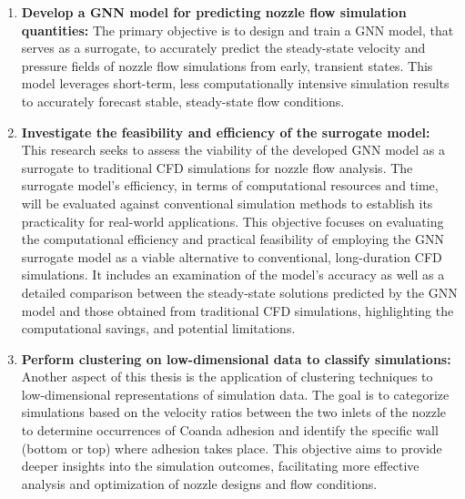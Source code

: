 \begin{enumerate}
\item \textbf{Develop a GNN model for predicting nozzle flow simulation quantities:} 
The primary objective is to design and train a GNN model, that serves as a surrogate, to accurately predict the steady-state velocity and pressure fields of nozzle flow simulations from early, transient states. This model leverages short-term, less computationally intensive simulation results to accurately forecast stable, steady-state flow conditions.
\item \textbf{Investigate the feasibility and efficiency of the surrogate model:} This research seeks to assess the viability of the developed GNN model as a surrogate to traditional CFD simulations for nozzle flow analysis. The surrogate model's efficiency, in terms of computational resources and time, will be evaluated against conventional simulation methods to establish its practicality for real-world applications.
This objective focuses on evaluating the computational efficiency and practical feasibility of employing the GNN surrogate model as a viable alternative to conventional, long-duration CFD simulations. It includes an examination of the model's accuracy as well as a detailed comparison between the steady-state solutions predicted by the GNN model and those obtained from traditional CFD simulations, highlighting the computational savings, and potential limitations.
\item \textbf{Perform clustering on low-dimensional data to classify simulations:} Another aspect of this thesis is the application of clustering techniques to low-dimensional representations of simulation data. The goal is to categorize simulations based on the velocity ratios between the two inlets of the nozzle to determine occurrences of Coanda adhesion and identify the specific wall (bottom or top) where adhesion takes place. This objective aims to provide deeper insights into the simulation outcomes, facilitating more effective analysis and optimization of nozzle designs and flow conditions.

\end{enumerate}

